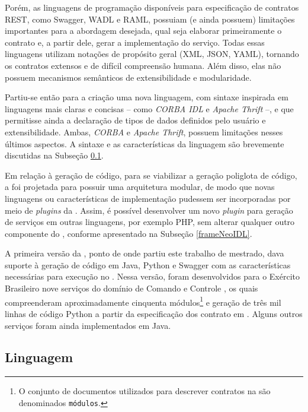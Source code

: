 Porém, as linguagens de programação disponíveis para especificação de
contratos REST, como Swagger\cite{swaggerSite}, WADL\cite{hadley2006web} e
RAML\cite{RAML}, possuiam (e ainda possuem) limitações importantes para a
abordagem desejada, qual seja elaborar primeiramente o contrato e, a
partir dele, gerar a implementação do serviço. Todas essas linguagens utilizam
notações de propósito geral (XML\cite{XML}, JSON\cite{JSon}, YAML\cite{YAML}),
tornando os contratos extensos e de difícil compreensão humana. Além disso,
elas não possuem mecanismos semânticos de extensibilidade e modularidade.

Partiu-se então para a criação uma nova linguagem, com sintaxe
inspirada em linguagens mais claras e concisas -- como \emph{CORBA
IDL}\texttrademark \cite{corba} e \emph{Apache
Thrift}\texttrademark\cite{thrift} --, e que permitisse ainda a declaração de
tipos de dados definidos pelo usuário e extensibilidade. Ambas, \emph{CORBA} e
\emph{Apache Thrift}, possuem limitações nesses últimos aspectos. A sintaxe e as
características da linguagem \neoidl{} são brevemente discutidas na Subseção
\ref{linguagemNeoIDL}.

Em relação à geração de código, para se viabilizar a geração poliglota de
código, a \neoidl{} foi projetada para possuir uma arquitetura modular, de modo
que novas linguagens ou características de implementação pudessem ser
incorporadas por meio de \textit{plugins} da \neoidl{}. Assim, é possível desenvolver um novo \textit{plugin} para geração de serviços em outras
linguagens, por exemplo PHP, sem alterar qualquer outro componente do \framework,
conforme apresentado na Subseção \ref{frameNeoIDL}.

A primeira versão da \neoidl{}, ponto de onde partiu este trabalho de mestrado,
dava suporte à geração de código em Java, Python e Swagger com as
características necessárias para execução no \neocortex{}. Nessa versão, foram
desenvolvidos para o Exército Brasileiro nove serviços do domínio de Comando e
Controle \cite{david:commandControl}, os quais compreenderam aproximadamente
cinquenta módulos\footnote{O conjunto de documentos
utilizados para descrever contratos na \neoidl{} são denominados
\texttt{módulos}.} e geração de três mil linhas de código Python a partir
da especificação dos contrato em \neoidl{}. Alguns outros serviços foram
ainda implementados em Java.



\subsection{Linguagem}
\label{linguagemNeoIDL}
\vspace{-6mm}

